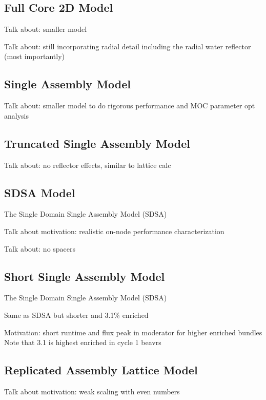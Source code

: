 \subsection{Full Core 2D Model}
\label{sec:beavrs-2D}

Talk about: smaller model

Talk about: still incorporating radial detail including the radial water reflector (most importantly)

\subsection{Single Assembly Model}
\label{sec:beavrs-single-assembly}

Talk about: smaller model to do rigorous performance and MOC parameter opt analysis

\subsection{Truncated Single Assembly Model}
\label{sec:trunc-single-assembly}

Talk about: no reflector effects, similar to lattice calc

\subsection{SDSA Model}
\label{sec:sdsa}

The Single Domain Single Assembly Model (SDSA)

Talk about motivation: realistic on-node performance characterization

Talk about: no spacers

\subsection{Short Single Assembly Model}
\label{sec:short-single-assembly}

The Single Domain Single Assembly Model (SDSA)

Same as SDSA but shorter and 3.1\% enriched

Motivation: short runtime and flux peak in moderator for higher enriched bundles
Note that 3.1 is highest enriched in cycle 1 beavrs

\subsection{Replicated Assembly Lattice Model}
\label{sec:assembly-lattice}

Talk about motivation: weak scaling with even numbers